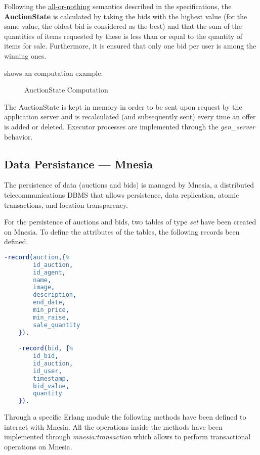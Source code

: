 Following the \underline{all-or-nothing} semantics described in the
specifications, the \textbf{AuctionState} is calculated by taking the bids with
the highest value (for the same value, the oldest bid is considered as the best)
and that the sum of the quantities of items requested by these is less than or
equal to the quantity of items for sale. Furthermore, it is ensured that only
one bid per user is among the winning ones.

 shows an  computation
example.


\begin{figure}[htb]
	\centering
	\caption{AuctionState Computation}\label{fig:auction-state-example}
\end{figure}

The AuctionState is kept in memory in order to be sent upon request by the
application server and is recalculated (and subsequently sent) every time an
offer is added or deleted. Executor processes are implemented through the
\textit{gen\_server} behavior.

\subsection{Data Persistance --- Mnesia}

The persistence of data (auctions and bids) is managed by Mnesia, a distributed
telecommunications DBMS that allows persistence, data replication, atomic
transactions, and location transparency.

For the persistence of auctions and bids, two tables of type \textit{set} have
been created on Mnesia. To define the attributes of the tables, the following
records been defined.

\begin{lstlisting}[language=Erlang, caption=Mnesia Record]
    -record(auction,{%
        id_auction,
        id_agent,
        name,
        image,
        description,
        end_date,
        min_price,
        min_raise,
        sale_quantity
    }).

    -record(bid, {%
        id_bid,
        id_auction,
        id_user,
        timestamp,
        bid_value,
        quantity
    }).
\end{lstlisting}

Through a specific Erlang module the following methods have been defined to
interact with Mnesia. All the operations inside the methods have been
implemented through \textit{mnesia:transaction} which allows to perform
transactional operations on Mnesia.

